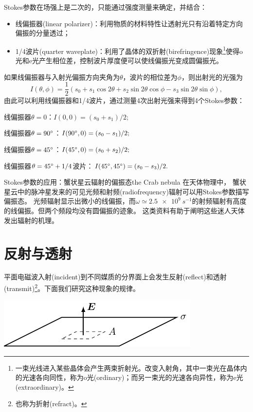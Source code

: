 Stokes参数在场强上是二次的，只能通过强度测量来确定，并结合：
\begin{itemize}
    \item 线偏振器(linear polarizer)：利用物质的材料特性让透射光只有沿着特定方向偏振的分量透过；
    \item 1/4波片(quarter waveplate)：利用了晶体的双折射(birefringence)现象\footnote{一束光线进入某些晶体会产生两束折射光。改变入射角，其中一束光在晶体内的光速各向同性，称为o光(ordinary)；而另一束光的光速各向异性，称为e光(extraordinary)。}使得o光和e光产生相位差，控制波片厚度便可以使线偏振光变成圆偏振光。
\end{itemize}
如果线偏振器与入射光偏振方向夹角为$\theta$，波片的相位差为$\phi$，则出射光的光强为
\[
    I(\theta,\phi)=\frac12(s_0+s_1\cos2\theta+s_2\sin2\theta\cos\phi-s_3\sin2\theta\sin\phi),
\]
由此可以利用线偏振器和1/4波片，通过测量4次出射光强来得到4个Stokes参数：
\begin{compactitem}
	\item 线偏振器$\theta=0$：$I(0,0)=(s_0+s_1)/2;$
    \item 线偏振器$\theta=90^\circ$：$I(90^\circ,0)=(s_0-s_1)/2;$
    \item 线偏振器$\theta=45^\circ$：$I(45^\circ,0)=(s_0+s_2)/2;$
    \item 线偏振器$\theta=45^\circ+1/4$波片：$I(45^\circ,45^\circ)=(s_0-s_3)/2.$
\end{compactitem}

\begin{example}
    {Stokes参数的应用：蟹状星云辐射的偏振态}{the Crab nebula}
    在天体物理中，
    蟹状星云中的脉冲星发来的可见光频和射频(radiofrequency)辐射可以用Stokes参数描写偏振态。
    光频辐射显示出微小的线偏振，而$\omega\simeq\SI{2.5e9}{s^{-1}}$的射频辐射有高度的线偏振。但两个频段均没有圆偏振的迹象。
    这类资料有助于阐明这些迷人天体发出辐射的机理。
\end{example}

\section{反射与透射}

平面电磁波入射(incident)到不同媒质的分界面上会发生反射(reflect)和透射(transmit)\footnote{也称为折射(refract)。}。下面我们研究这种现象的规律。
\begin{center}
	\includegraphics[page=22]{figures/tikz/layouts.pdf}
    \label{fig:refraction}
\end{center}

